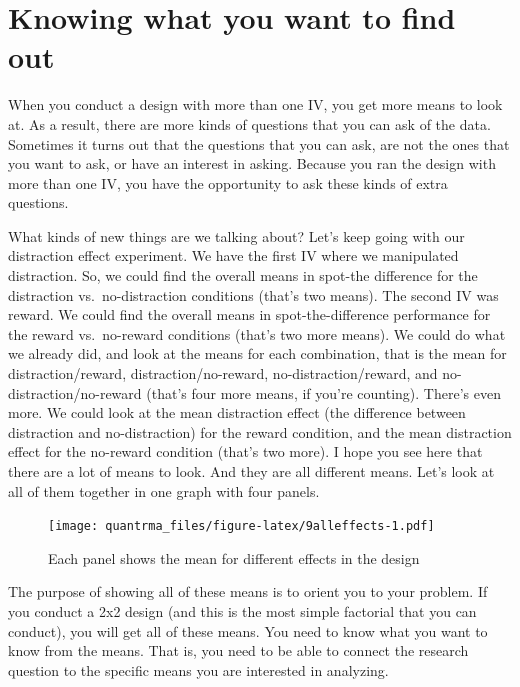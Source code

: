 \documentclass[
]{book}
\begin{document}
\hypertarget{knowing-what-you-want-to-find-out}{%
\section{Knowing what you want to find out}\label{knowing-what-you-want-to-find-out}}

When you conduct a design with more than one IV, you get more means to look at. As a result, there are more kinds of questions that you can ask of the data. Sometimes it turns out that the questions that you can ask, are not the ones that you want to ask, or have an interest in asking. Because you ran the design with more than one IV, you have the opportunity to ask these kinds of extra questions.

What kinds of new things are we talking about? Let's keep going with our distraction effect experiment. We have the first IV where we manipulated distraction. So, we could find the overall means in spot-the difference for the distraction vs.~no-distraction conditions (that's two means). The second IV was reward. We could find the overall means in spot-the-difference performance for the reward vs.~no-reward conditions (that's two more means). We could do what we already did, and look at the means for each combination, that is the mean for distraction/reward, distraction/no-reward, no-distraction/reward, and no-distraction/no-reward (that's four more means, if you're counting). There's even more. We could look at the mean distraction effect (the difference between distraction and no-distraction) for the reward condition, and the mean distraction effect for the no-reward condition (that's two more). I hope you see here that there are a lot of means to look. And they are all different means. Let's look at all of them together in one graph with four panels.

\begin{figure}
\centering
\texttt{[image: quantrma\_files/figure-latex/9alleffects-1.pdf]}
\caption{\label{fig:9alleffects}Each panel shows the mean for different effects in the design}
\end{figure}

The purpose of showing all of these means is to orient you to your problem. If you conduct a 2x2 design (and this is the most simple factorial that you can conduct), you will get all of these means. You need to know what you want to know from the means. That is, you need to be able to connect the research question to the specific means you are interested in analyzing.
\end{document}
